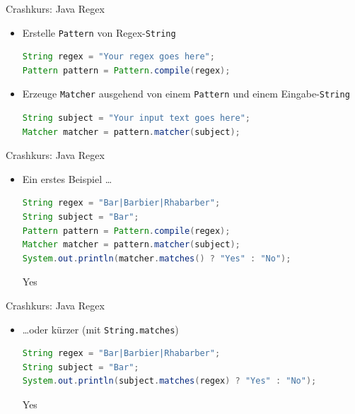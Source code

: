 \documentclass[18pt]{beamer}
\begin{document}
\begin{frame}[fragile]{Crashkurs: Java Regex}
    \begin{itemize}
        \item Erstelle \texttt{Pattern} von Regex-\texttt{String}
    \begin{lstlisting}[language=Java,basicstyle=\scriptsize]
String regex = "Your regex goes here";
Pattern pattern = Pattern.compile(regex);
    \end{lstlisting}
        \vspace{.2in}
        \item Erzeuge \texttt{Matcher} ausgehend von einem \texttt{Pattern} und einem Eingabe-\texttt{String}

        \begin{lstlisting}[language=Java,basicstyle=\scriptsize]
String subject = "Your input text goes here";
Matcher matcher = pattern.matcher(subject);
        \end{lstlisting}

    \end{itemize}

\end{frame}

\begin{frame}[fragile]{Crashkurs: Java Regex}
    \begin{itemize}
        \item Ein erstes Beispiel \dots
        \begin{lstlisting}[language=Java,basicstyle=\scriptsize]
String regex = "Bar|Barbier|Rhabarber";
String subject = "Bar";
Pattern pattern = Pattern.compile(regex);
Matcher matcher = pattern.matcher(subject);
System.out.println(matcher.matches() ? "Yes" : "No");
        \end{lstlisting}
        \begin{exampleblock}{}
Yes
        \end{exampleblock}

    \end{itemize}
\end{frame}





\begin{frame}[fragile]{Crashkurs: Java Regex}
    \begin{itemize}
        \item \dots oder kürzer (mit \texttt{String.matches})

        \begin{lstlisting}[language=Java,basicstyle=\scriptsize]
String regex = "Bar|Barbier|Rhabarber";
String subject = "Bar";
System.out.println(subject.matches(regex) ? "Yes" : "No");
        \end{lstlisting}

        \begin{exampleblock}{}
Yes
        \end{exampleblock}

    \end{itemize}
\end{frame}
\end{document}
